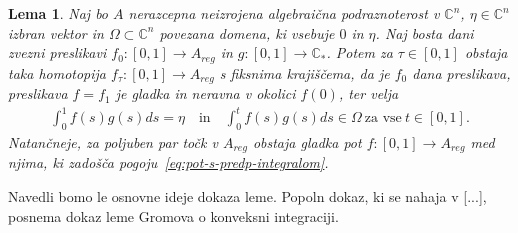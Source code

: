 \documentclass[12pt,a4paper,twoside]{article}
\theoremstyle{definition} %
\theoremstyle{plain} %
\newtheorem{lema}[definicija]{Lema}
\numberwithin{equation}{section}  %
\begin{document}
\begin{lema} \label{lema:analog-gromova}
Naj bo $A$ nerazcepna neizrojena algebraična podraznoterost v $\mathbb{C}^{n}$, $\eta \in \mathbb{C}^{n}$ izbran vektor in $\Omega \subset \mathbb{C}^{n}$ povezana domena, ki vsebuje $0$ in $\eta$. 
Naj bosta dani zvezni preslikavi $f_0 \colon [0,1] \to A_{reg}$ in $g \colon [0,1] \to \mathbb{C}_{*}$.
Potem za $\tau \in [0,1]$ obstaja taka homotopija $f_{\tau} \colon [0,1] \to A_{reg}$ s fiksnima krajiščema, da je $f_0$ dana preslikava, preslikava $f = f_1$ je gladka in neravna v okolici $f(0)$, ter velja
\begin{gather} \label{eq:pot-s-predp-integralom}
\int_{0}^{1} f(s)g(s)ds = \eta \quad \textrm{in} \quad \int_{0}^{t} f(s)g(s)ds \in \Omega \ \textrm{za vse} \ t \in [0,1].
\end{gather}
Natančneje, za poljuben par točk v $A_{reg}$ obstaja gladka pot $f \colon [0,1] \to A_{reg}$ med njima, ki zadošča pogoju~\eqref{eq:pot-s-predp-integralom}.
\end{lema}

Navedli bomo le osnovne ideje dokaza leme. Popoln dokaz, ki se nahaja v [...], posnema dokaz leme Gromova o konveksni integraciji.
\end{document}
